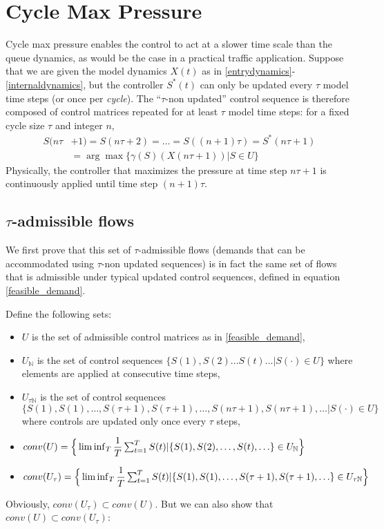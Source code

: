 \section{Cycle Max Pressure}

Cycle max pressure enables the control to act at a slower time scale than the queue dynamics, as would be the case in a practical traffic application. Suppose that we are given the model dynamics $X(t)$ as in \eqref{entrydynamics}-\eqref{internaldynamics}, but the controller $S^*(t)$ can only be updated every $\tau$ model time steps (or once per \emph{cycle}). The ``$\tau$-non updated'' control sequence is therefore composed of control matrices repeated for at least $\tau$ model time steps: for a fixed cycle size $\tau$ and integer $n$, 
\begin{align} \nonumber
S(n\tau&+1)  = S(n\tau +2) = \ldots = S((n+1)\tau ) = S^*(n\tau +1) \\
&=  \arg\max\{\gamma(S)(X(n\tau +1 )) \vert S \in U\}  
 \label{CYCLE_CONTROLLER}
\end{align}
Physically, the controller that maximizes the pressure at time step $n\tau + 1$ is continuously applied until time step $(n + 1)\tau$.

\subsection*{$\tau$-admissible flows}
We first prove that this set of $\tau$-admissible flows (demands that can be accommodated using $\tau$-non updated sequences) is in fact the same set of flows that is admissible under typical updated control sequences, defined in equation \eqref{feasible_demand}. 

\noindent Define the following sets:
\begin{itemize}
\item $U$ is the set of admissible control matrices as in \eqref{feasible_demand},
\item $U_{\mathbb{N}}$ is the set of control sequences $\{S(1), S(2) \ldots S(t) \ldots |  S(\cdot) \in U\} $ where elements are applied at consecutive time steps,
\item $U_{\tau\mathbb{N}}$ is the set of control sequences $\{S(1), S(1), \ldots ,  S(\tau + 1),S(\tau + 1), \ldots , S(n\tau + 1),S(n\tau + 1), \ldots |  S(\cdot) \in U\} $ where controls are updated only once every $\tau$ steps,
\item $conv(U) = \Big\{\lim\inf_{T} \dfrac{1}{T}\sum_{t=1}^{T} S(t) | \{S(1), S(2), \ldots , \\ S(t), \ldots \}\in U_{\mathbb{N}} \Big\} $ 
\item $conv(U_\tau ) = \Big\{\lim\inf_{T} \dfrac{1}{T}\sum_{t=1}^{T} S(t) | \{S(1), S(1), \ldots, \\ S(\tau + 1),S(\tau + 1), \ldots\}\in U_{\tau\mathbb{N}} \Big\} $ 
\end{itemize}
Obviously, $conv(U_{\tau}) \subset conv(U)$. But we can also show that $conv(U) \subset conv(U_{\tau})$:  

